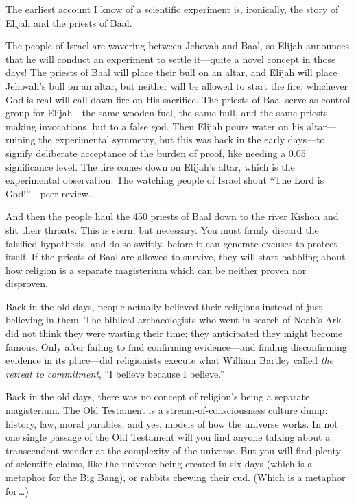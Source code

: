 \myendsectiontext


\bigskip


{
 The earliest account I know of a scientific experiment is,
ironically, the story of Elijah and the priests of Baal. }

{
 The people of Israel are wavering between Jehovah and Baal, so
Elijah announces that he will conduct an experiment to settle
it---quite a novel concept in those days! The priests of Baal will
place their bull on an altar, and Elijah will place
Jehovah's bull on an altar, but neither will be allowed
to start the fire; whichever God is real will call down fire on His
sacrifice. The priests of Baal serve as control group for Elijah---the
same wooden fuel, the same bull, and the same priests making
invocations, but to a false god. Then Elijah pours water on his
altar---ruining the experimental symmetry, but this was back in the
early days---to signify deliberate acceptance of the burden of proof,
like needing a 0.05 significance level. The fire comes down on
Elijah's altar, which is the experimental observation.
The watching people of Israel shout ``The Lord is
God!''---peer review.}

{
 And then the people haul the 450 priests of Baal down to the river
Kishon and slit their throats. This is stern, but necessary. You must
firmly discard the falsified hypothesis, and do so swiftly, before it
can generate excuses to protect itself. If the priests of Baal are
allowed to survive, they will start babbling about how religion is a
separate magisterium which can be neither proven nor disproven.}

{
 Back in the old days, people actually believed their religions
instead of just believing in them. The biblical archaeologists who went
in search of Noah's Ark did not think they were wasting
their time; they anticipated they might become famous. Only after
failing to find confirming evidence---and finding disconfirming
evidence in its place---did religionists execute what William Bartley
called \textit{the retreat to commitment}, ``I believe
because I believe.''}

{
 Back in the old days, there was no concept of
religion's being a separate magisterium. The Old
Testament is a stream-of-consciousness culture dump: history, law,
moral parables, and yes, models of how the universe works. In not one
single passage of the Old Testament will you find anyone talking about
a transcendent wonder at the complexity of the universe. But you will
find plenty of scientific claims, like the universe being created in
six days (which is a metaphor for the Big Bang), or rabbits chewing
their cud. (Which is a metaphor for\,\ldots)}

